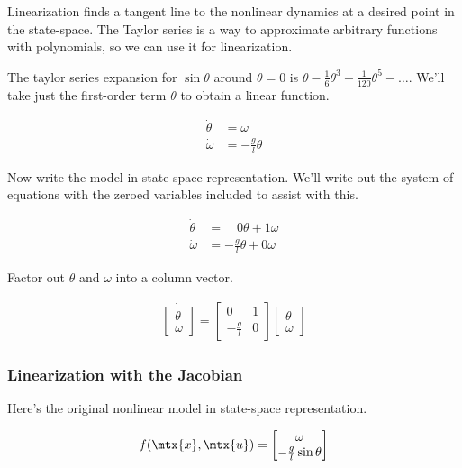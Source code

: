 Linearization finds a tangent line to the nonlinear dynamics at a desired point
in the state-space. The Taylor series is a way to approximate arbitrary
functions with polynomials, so we can use it for linearization.

The taylor series expansion for $\sin\theta$ around $\theta = 0$ is
$\theta - \frac{1}{6} \theta^3 + \frac{1}{120} \theta^5 - \ldots$. We'll take
just the first-order term $\theta$ to obtain a linear function.

\begin{align*}
  \dot{\theta} &= \omega \\
  \dot{\omega} &= -\frac{g}{l} \theta
\end{align*}

Now write the \gls{model} in state-space representation. We'll write out the
system of equations with the zeroed variables included to assist with this.

\begin{align*}
  \dot{\theta} &= \;\;\;\,0 \theta + 1 \omega \\
  \dot{\omega} &= -\frac{g}{l} \theta + 0 \omega
\end{align*}

Factor out $\theta$ and $\omega$ into a column vector.

\begin{align}
  \dot{
  \begin{bmatrix}
    \theta \\
    \omega
  \end{bmatrix}} =
  \begin{bmatrix}
    0 & 1 \\
    -\frac{g}{l} & 0
  \end{bmatrix}
  \begin{bmatrix}
    \theta \\
    \omega
  \end{bmatrix}
\end{align}

\subsubsection{Linearization with the Jacobian}

Here's the original nonlinear model in state-space representation.

\begin{equation*}
  f(\mtx{x}, \mtx{u}) =
  \begin{bmatrix}
    \omega \\
    -\frac{g}{l}\sin\theta
  \end{bmatrix}
\end{equation*}

